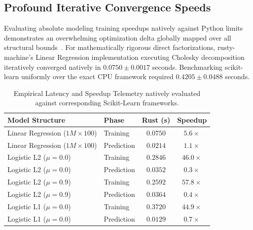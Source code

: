 \documentclass[conference]{IEEEtran}
\begin{document}
\subsection{Profound Iterative Convergence Speeds}
Evaluating absolute modeling training speedups natively against Python limits demonstrates an overwhelming optimization delta globally mapped over all structural bounds~\cite{ref21}. For mathematically rigorous direct factorizations, rusty-machine's Linear Regression implementation executing Cholesky decomposition iteratively converged natively in $0.0750 \pm 0.0017$ seconds. Benchmarking scikit-learn uniformly over the exact CPU framework required $0.4205 \pm 0.0488$ seconds.

\begin{table}[h]
\caption{Empirical Latency and Speedup Telemetry natively evaluated against corresponding Scikit-Learn frameworks.}
\label{tab:benchmark}
\centering
\begin{tabular}{@{}llcc@{}}
\toprule
\textbf{Model Structure} & \textbf{Phase} & \textbf{Rust (s)} & \textbf{Speedup} \\ \midrule
Linear Regression ($1M \times 100$)  & Training        & $0.0750$          & $5.6\times$       \\
Linear Regression ($1M \times 100$)  & Prediction      & $0.0214$          & $1.1\times$       \\
Logistic L2 ($\mu=0.0$)  & Training        & $0.2846$          & \textbf{$46.0\times$} \\
Logistic L2 ($\mu=0.0$)  & Prediction      & $0.0352$          & $0.3\times$       \\
Logistic L2 ($\mu=0.9$)  & Training        & $0.2592$          & \textbf{$57.8\times$} \\
Logistic L2 ($\mu=0.9$)  & Prediction      & $0.0364$          & $0.4\times$       \\
Logistic L1 ($\mu=0.0$)  & Training        & $0.3720$          & \textbf{$44.9\times$} \\
Logistic L1 ($\mu=0.0$)  & Prediction      & $0.0129$          & $0.7\times$       \\ \bottomrule
\end{tabular}
\end{table}
\end{document}
